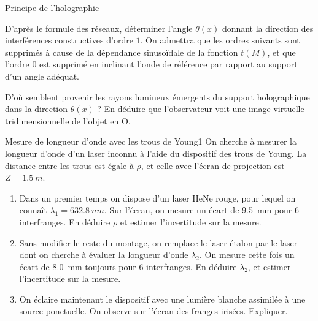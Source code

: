 \begin{exo}[PC][3][TD]{Principe de l'holographie}
\begin{quest}
    \item D'après le formule des réseaux, déterminer l'angle $\theta(x)$ donnant la direction des interférences constructives d'ordre $1$. On admettra que les ordres suivants sont supprimés à cause de la dépendance sinusoïdale de la fonction $t(M)$, et que l'ordre $0$ est supprimé en inclinant l'onde de référence par rapport au support d'un angle adéquat.
    \item D'où semblent provenir les rayons lumineux émergents du support holographique dans la direction $\theta(x)$ ? En déduire que l'observateur voit une image virtuelle tridimensionnelle de l'objet en O.
  \end{quest}
  \end{exo}
  

\begin{exo}[PC]{Mesure de longueur d'onde avec les trous de Young}{1}
On cherche à mesurer la longueur d'onde d'un laser inconnu à l'aide du dispositif des trous de Young. La distance entre les trous est égale à $\rho$, et celle avec l'écran de projection est $Z=\SI{1,5}{m}$.
\begin{enumerate}
\item Dans un premier temps on dispose d'un laser HeNe rouge, pour lequel on connaît $\lambda_1=\SI{632,8}{nm}$. Sur l'écran, on mesure un écart de \SI{9,5}{mm} pour 6 interfranges. En déduire $\rho$ et estimer l'incertitude sur la mesure.
\item Sans modifier le reste du montage, on remplace le laser étalon par le laser dont on cherche à évaluer la longueur d'onde $\lambda_2$. On mesure cette fois un écart de \SI{8,0}{mm} toujours pour 6 interfranges. En déduire $\lambda_2$, et estimer l'incertitude sur la mesure.
\item On éclaire maintenant le dispositif avec une lumière blanche assimilée à une source ponctuelle. On observe sur l'écran des franges irisées. Expliquer.
\end{enumerate}
\end{exo}

